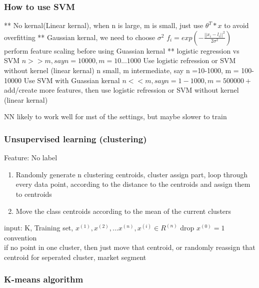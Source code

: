\documentclass{article}
\begin{document}
\subsubsection{How to use SVM}

  ** No kernal(Linear kernal), when n is large, m is small, just use $\theta^T*x$ to avoid overfitting
  ** Gaussian kernal, we need to choose $\sigma^2$
  $f_i = exp(-\frac{||x_i-l_i||^2}{2\sigma^2})$
  perform feature scaling before using Guassian kernal
  ** logistic regression vs SVM
  $n >> m, say n = 10000, m = 10...1000$
  Use logistic refression or SVM without kernel (linear kernal)
  n small, m intermediate, say n =10-1000, m = 100-10000
  Use SVM with Guassian kernal
  $n << m, say n = 1-1000, m = 500000+$
  add/create more features, then use logistic refression or SVM without kernel (linear kernal)

  NN likely to work well for mst of the settings, but maybe slower to train


\subsubsection{Unsupervised learning (clustering)}
  Feature: No label\\

  \begin{enumerate}
    \item Randomly generate n clustering centroids, cluster assign part, loop through every data point, according to the distance to the centroids and assign them to centroids
    \item Move the class centroids according to the mean of the current clusters
  \end{enumerate}

  input: K, Training set, ${x^{(1)},x^{(2)},...x^{(n)}, x^{(i)}\in R^{(n)}}$ drop $x^(0)=1$ convention \\
  if no point in one cluster, then just move that centroid, or randomly reassign that centroid
  for seperated cluster, market segment
\subsubsection{K-means algorithm}
 
\end{document}
